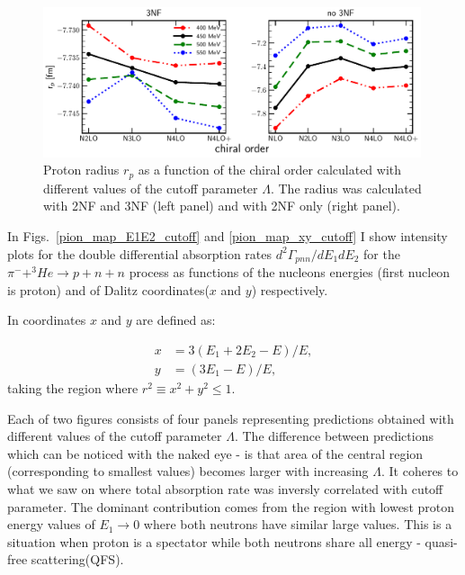     \begin{figure}[h]
        \begin{center}
        \includegraphics[width=0.99\textwidth]{PlotData/PION/Dalitz_maps/figures/proton_radius_mt31_3NF.pdf}
        \end{center}
        \caption{ Proton radius $r_p$ as a function of the chiral order calculated with
        different values of the cutoff parameter $\Lambda$. The radius was calculated with 2NF and 3NF (left panel)
        and with 2NF only (right panel).}
        \label{proton_rad}
    \end{figure}

    In Figs.~\ref{pion_map_E1E2_cutoff} and \ref{pion_map_xy_cutoff} I show 
    intensity plots for the double differential absorption rates
    $d^2 \Gamma_{pnn}/dE_1dE_2$ for the $\pi^- + ^3He \rightarrow p + n + n$
    process as functions of the nucleons energies (first nucleon is proton) and 
    of  Dalitz coordinates($x$ and $y$) respectively.

    In  coordinates $x$ and $y$ are defined as:

    \begin{align}
        x &= 3 (E_1 + 2E_2 - E)/E, \nonumber\\
        y &= (3E_1 - E)/E,
        \label{dalitz_xy}
    \end{align}
    taking the region where $r^2 \equiv x^2 + y^2 \leq 1$.

    Each of two figures consists of four panels representing predictions obtained with different 
    values of the cutoff parameter $\Lambda$. The difference between predictions which can be 
    noticed with the naked eye - is that area of the central region (corresponding to smallest values)
    becomes larger with increasing $\Lambda$. It coheres to what we saw on 
    where total absorption rate was inversly correlated with cutoff parameter. The dominant contribution
    comes from the region with lowest proton energy values of $E_1 \rightarrow 0$ where both neutrons have similar large values.
    This is a situation when proton is a spectator while both neutrons share all energy
    - quasi-free scattering(QFS). 

